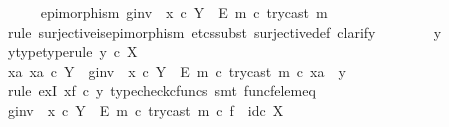 \begin{isabellebody}
\isanewline
\ \ \ \ \isamarkupfalse%
\ {\isachardoublequoteopen}epimorphism\ {\isacharparenleft}{\kern0pt}g{\isacharunderscore}{\kern0pt}inv\ {\isasymamalg}\ {\isacharparenleft}{\kern0pt}x\ {\isasymcirc}\isactrlsub c\ {\isasymbeta}\isactrlbsub Y\ {\isasymsetminus}\ {\isacharparenleft}{\kern0pt}E{\isacharcomma}{\kern0pt}\ m{\isacharparenright}{\kern0pt}\isactrlesub {\isacharparenright}{\kern0pt}\ {\isasymcirc}\isactrlsub c\ try{\isacharunderscore}{\kern0pt}cast\ m{\isacharparenright}{\kern0pt}{\isachardoublequoteclose}\isanewline
\ \ \ \ \isamarkupfalse%
\ {\isacharparenleft}{\kern0pt}rule\ surjective{\isacharunderscore}{\kern0pt}is{\isacharunderscore}{\kern0pt}epimorphism{\isacharcomma}{\kern0pt}\ etcs{\isacharunderscore}{\kern0pt}subst\ surjective{\isacharunderscore}{\kern0pt}def{}{\isacharcomma}{\kern0pt}\ clarify{\isacharparenright}{\kern0pt}\isanewline
\ \ \ \ \ \ \isamarkupfalse%
\ y\isanewline
\ \ \ \ \ \ \isamarkupfalse%
\ y{\isacharunderscore}{\kern0pt}type{\isacharbrackleft}{\kern0pt}type{\isacharunderscore}{\kern0pt}rule{\isacharbrackright}{\kern0pt}{\isacharcolon}{\kern0pt}\ {\isachardoublequoteopen}y\ {\isasymin}\isactrlsub c\ X{\isachardoublequoteclose}\isanewline
\ \ \ \ \ \ \isamarkupfalse%
\ {\isachardoublequoteopen}{\isasymexists}xa{\isachardot}{\kern0pt}\ xa\ {\isasymin}\isactrlsub c\ Y\ {\isasymand}\ {\isacharparenleft}{\kern0pt}g{\isacharunderscore}{\kern0pt}inv\ {\isasymamalg}\ {\isacharparenleft}{\kern0pt}x\ {\isasymcirc}\isactrlsub c\ {\isasymbeta}\isactrlbsub Y\ {\isasymsetminus}\ {\isacharparenleft}{\kern0pt}E{\isacharcomma}{\kern0pt}\ m{\isacharparenright}{\kern0pt}\isactrlesub {\isacharparenright}{\kern0pt}\ {\isasymcirc}\isactrlsub c\ try{\isacharunderscore}{\kern0pt}cast\ m{\isacharparenright}{\kern0pt}\ {\isasymcirc}\isactrlsub c\ xa\ {\isacharequal}{\kern0pt}\ y{\isachardoublequoteclose}\isanewline
\ \ \ \ \ \ \ \ \isamarkupfalse%
\ {\isacharparenleft}{\kern0pt}rule\ exI{\isacharbrackleft}{\kern0pt}\ x{\isacharequal}{\kern0pt}{\isachardoublequoteopen}f\ {\isasymcirc}\isactrlsub c\ y{\isachardoublequoteclose}{\isacharbrackright}{\kern0pt}{\isacharcomma}{\kern0pt}\ typecheck{\isacharunderscore}{\kern0pt}cfuncs{\isacharcomma}{\kern0pt}\ smt\ func{\isacharunderscore}{\kern0pt}f{\isacharunderscore}{\kern0pt}elem{\isacharunderscore}{\kern0pt}eq{\isacharparenright}{\kern0pt}\isanewline
\ \ \ \ \isamarkupfalse%
\isanewline
\ \ \ \ \isamarkupfalse%
\ {\isachardoublequoteopen}{\isacharparenleft}{\kern0pt}g{\isacharunderscore}{\kern0pt}inv\ {\isasymamalg}\ {\isacharparenleft}{\kern0pt}x\ {\isasymcirc}\isactrlsub c\ {\isasymbeta}\isactrlbsub Y\ {\isasymsetminus}\ {\isacharparenleft}{\kern0pt}E{\isacharcomma}{\kern0pt}\ m{\isacharparenright}{\kern0pt}\isactrlesub {\isacharparenright}{\kern0pt}\ {\isasymcirc}\isactrlsub c\ try{\isacharunderscore}{\kern0pt}cast\ m{\isacharparenright}{\kern0pt}\ {\isasymcirc}\isactrlsub c\ f\ {\isacharequal}{\kern0pt}\ id\isactrlsub c\ X{\isachardoublequoteclose}\isanewline

\end{isabellebody}
